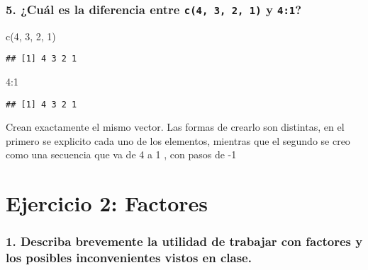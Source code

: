 \documentclass[
]{article}
\newenvironment{Shaded}{\begin{snugshade}}{\end{snugshade}}
\newcommand{\DecValTok}[1]{\textcolor[rgb]{0.00,0.00,0.81}{#1}}
\newcommand{\FunctionTok}[1]{\textcolor[rgb]{0.00,0.00,0.00}{#1}}
\newcommand{\NormalTok}[1]{#1}
\newcommand{\SpecialCharTok}[1]{\textcolor[rgb]{0.00,0.00,0.00}{#1}}
\begin{document}
\hypertarget{cuuxe1l-es-la-diferencia-entre-c4-3-2-1-y-41}{%
\subsubsection{\texorpdfstring{5. ¿Cuál es la diferencia entre
\texttt{c(4,\ 3,\ 2,\ 1)} y
\texttt{4:1}?}{5. ¿Cuál es la diferencia entre c(4, 3, 2, 1) y 4:1?}}\label{cuuxe1l-es-la-diferencia-entre-c4-3-2-1-y-41}}

\begin{Shaded}
\begin{Highlighting}[]
\FunctionTok{c}\NormalTok{(}\DecValTok{4}\NormalTok{, }\DecValTok{3}\NormalTok{, }\DecValTok{2}\NormalTok{, }\DecValTok{1}\NormalTok{)}
\end{Highlighting}
\end{Shaded}

\begin{verbatim}
## [1] 4 3 2 1
\end{verbatim}

\begin{Shaded}
\begin{Highlighting}[]
\DecValTok{4}\SpecialCharTok{:}\DecValTok{1}
\end{Highlighting}
\end{Shaded}

\begin{verbatim}
## [1] 4 3 2 1
\end{verbatim}

Crean exactamente el mismo vector. Las formas de crearlo son distintas,
en el primero se explicito cada uno de los elementos, mientras que el
segundo se creo como una secuencia que va de 4 a 1 , con pasos de -1

\newpage

\hypertarget{ejercicio-2-factores}{%
\section{Ejercicio 2: Factores}\label{ejercicio-2-factores}}

\hypertarget{describa-brevemente-la-utilidad-de-trabajar-con-factores-y-los-posibles-inconvenientes-vistos-en-clase.}{%
\subsubsection{1. Describa brevemente la utilidad de trabajar con
factores y los posibles inconvenientes vistos en
clase.}\label{describa-brevemente-la-utilidad-de-trabajar-con-factores-y-los-posibles-inconvenientes-vistos-en-clase.}}
\end{document}
